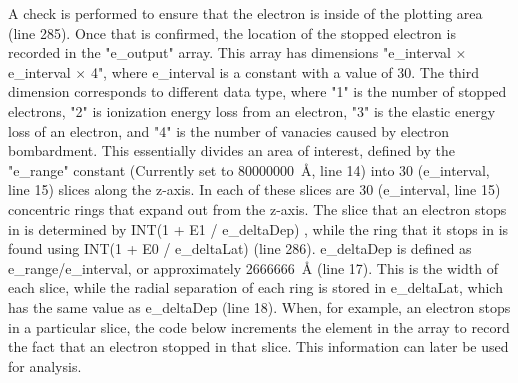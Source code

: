 \documentclass[10pt, reqno]{exam}
\begin{document}
A check is performed to ensure that the electron is inside of the plotting area (line 285). Once that is confirmed, the location of the stopped electron is recorded in the "e\_output" array. This array has dimensions "e\_interval $\times$ e\_interval $\times$ 4", where e\_interval is a constant with a value of 30. The third dimension corresponds to different data type, where "1" is the number of stopped electrons, "2" is ionization energy loss from an electron, "3" is the elastic energy loss of an electron, and "4" is the number of vanacies caused by electron bombardment. This essentially divides an area of interest, defined by the "e\_range" constant (Currently set to \SI{80000000}{\angstrom}, line 14) into 30 (e\_interval, line 15) slices along the z-axis. In each of these slices are 30 (e\_interval, line 15) concentric rings that expand out from the z-axis. The slice that an electron stops in is determined by INT(1 + E1 / e\_deltaDep) , while the ring that it stops in is found using INT(1 + E0 / e\_deltaLat) (line 286). e\_deltaDep is defined as e\_range/e\_interval, or approximately \SI{2666666}{\angstrom} (line 17). This is the width of each slice, while the radial separation of each ring is stored in e\_deltaLat, which has the same value as e\_deltaDep (line 18). When, for example, an electron stops in a particular slice, the code below increments the element in the array to record the fact that an electron stopped in that slice. This information can later be used for analysis. \par
\end{document}
